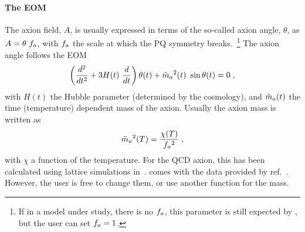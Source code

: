 \documentclass[11pt,a4paper]{article}
\begin{document}
\paragraph{The EOM} 
%
The axion field, $A$, is usually expressed in terms of the so-called axion angle, $\theta$, as $A = \theta \ f_{a}{}$, with $f_{a}{}$ the scale at which the PQ symmetry breaks.~\footnote{If in a model under study, there is no $f_{a}{}$, this parameter is still expected by \mimes, but the user can set $f_{a}{}=1$.} 
%
The axion angle follows the EOM 
%
\begin{equation}
	\lrb{\dfrac{d^2}{d t^2} + 3 H(t) \ \dfrac{d}{d t} } \theta(t) + \maT^2(t) \ \sin \theta(t) = 0 \; ,
	\label{eq:eom}
\end{equation}
%
with $H(t)$ the Hubble parameter (determined by the cosmology), and $\tilde m_{a}{}(t)$  the time (temperature) dependent mass of the axion. Usually the axion mass is written as
%
\begin{equation}
	\tilde m_{a}{}^2(T) = \dfrac{\chi(T)}{f_{a}{}^2}\;,
	\label{eq:axion_mass_def}
\end{equation} 
%
with $\chi$ a function of the temperature. For the QCD axion, this has been calculated using lattice simulations in~\cite{Borsanyi:2016ksw}. \mimes comes with the data provided by ref.~\cite{Borsanyi:2016ksw}. However, the user is free to change them, or use another function for the mass.
\end{document}
